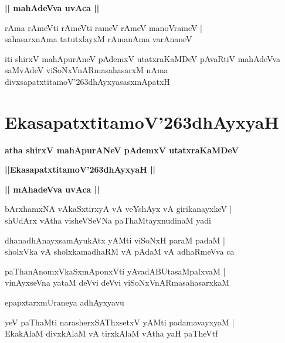 \documentclass[twoside,12pt,openright]{book}
\def\S{\char'263}
\newcounter{shloka}[chapter]
\def\uvaca#1{\centerline{{\large\textbf{#1}}}}
\begin{document}
\uvaca{|| mahAdeVva uvAca ||}

\begin{shloka}%
rAma rAmeVti rAmeVti rameV rAmeV manoVrameV |\\
sahasarxnAma tatutxlayxM rAmanAma varAnaneV 
\end{shloka}

\begin{center}
iti shirxV mahApurAneV pAdemxV utatxraKaMDeV pAvaRtiV mahAdeVva saMvAdeV viSoNxVnARmasahasarxM nAma 
divxsapatxtitamoV\S dhAyxyasasxmApatxH 
\end{center}

\chapter{EkasapatxtitamoV\S dhAyxyaH}

\begin{center}
{\LARGE\bfseries atha shirxV mahApurANeV pAdemxV utatxraKaMDeV}
\end{center}

\begin{center}
{\LARGE\bfseries ||EkasapatxtitamoV\S dhAyxyaH || }
\end{center}

\uvaca{|| mAhadeVva uvAca ||}

\begin{shloka}%
bArxhamxNA vAkaSxtirxyA vA veYshAyx vA girikanayxkeV |\\
shUdArx vAtha visheVSeVNa paThaMtayxnudinaM yadi
\end{shloka}

\begin{shloka}%
dhanadhAnayxsamAyukAtx yAMti viSoNxH paraM padaM |\\
sholxVka vA sholxkamadhaRM vA pAdaM vA adhaRmeVva ca 
\end{shloka}

\begin{shloka}%
paThanAnomxVkaSxmAponxVti yAvadABUtasaMpalxvaM |\\
vinAyxseVna yataM deVvi deVvi viSoNxVnARmasahasarxkaM 
\end{shloka}

\begin{center}
epapxtarxmUraneya adhAyxyavu
\end{center}
 
\begin{shloka}%
yeV paThaMti narasherxSAThxsetxV yAMti padamavayxyaM |\\
EkakAlaM divxkAlaM vA tirxkAlaM vAtha yaH paTheVtf
\end{shloka}
\end{document}
